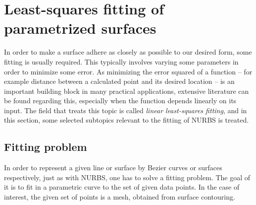 \section{Least-squares fitting of parametrized surfaces}
In order to make a surface adhere as closely as possible to our desired form, some fitting is usually required. This typically involves varying some parameters in order to minimize some error. As minimizing the error squared of a function -- for example distance between a calculated point and its desired location -- is an important building block in many practical applications, extensive literature can be found regarding this, especially when the function depends linearly on its input. The field that treats this topic is called \emph{linear least-squares fitting}, and in this section, some selected subtopics relevant to the fitting of \acs{NURBS} is treated.


\subsection{Fitting problem}
In order to represent a given line or surface by Bezier curves or surfaces respectively, just as with NURBS, one has to solve a fitting problem. The goal of it is to fit in a parametric curve to the set of given data points. In the case of interest, the given set of points is a mesh, obtained from surface contouring.
